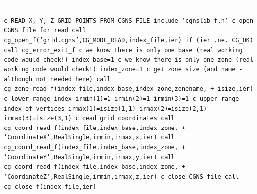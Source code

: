 \documentclass[12pt]{article}
\begin{document}
--------------------------------------------------------------------

{\tt \noindent c  READ X, Y, Z GRID POINTS FROM CGNS FILE
\newline\indent      include 'cgnslib\_f.h'
\newline c   open CGNS file for read
\newline\indent      call cg\_open\_f('grid.cgns',CG\_MODE\_READ,index\_file,ier)
\newline\indent      if (ier .ne. CG\_OK) call cg\_error\_exit\_f
\newline c  we know there is only one base (real working code would check!)
\newline\indent      index\_base=1
\newline c  we know there is only one zone (real working code would check!)
\newline\indent      index\_zone=1
\newline c   get zone size (and name - although not needed here)
\newline\indent      call cg\_zone\_read\_f(index\_file,index\_base,index\_zone,zonename,
\newline + \indent isize,ier)
\newline c   lower range index 
\newline\indent      irmin(1)=1
\newline\indent      irmin(2)=1
\newline\indent      irmin(3)=1
\newline c   upper range index of vertices
\newline\indent      irmax(1)=isize(1,1)
\newline\indent      irmax(2)=isize(2,1)
\newline\indent      irmax(3)=isize(3,1)
\newline c   read grid coordinates
\newline\indent      call cg\_coord\_read\_f(index\_file,index\_base,index\_zone,
\newline + \indent 'CoordinateX',RealSingle,irmin,irmax,x,ier)
\newline\indent      call cg\_coord\_read\_f(index\_file,index\_base,index\_zone,
\newline + \indent 'CoordinateY',RealSingle,irmin,irmax,y,ier)
\newline\indent      call cg\_coord\_read\_f(index\_file,index\_base,index\_zone,
\newline + \indent 'CoordinateZ',RealSingle,irmin,irmax,z,ier)
\newline c  close CGNS file
\newline\indent      call cg\_close\_f(index\_file,ier)}
\end{document}
